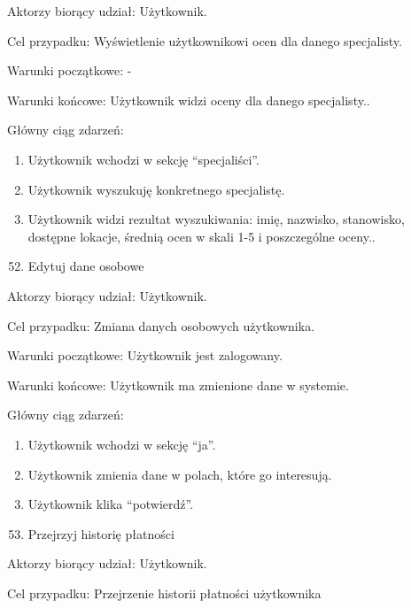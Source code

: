 \documentclass[
]{article}
\providecommand{\tightlist}{%
  \setlength{\itemsep}{0pt}\setlength{\parskip}{0pt}}
\begin{document}
{Aktorzy biorący udział: Użytkownik.}

{Cel przypadku: Wyświetlenie użytkownikowi ocen dla danego specjalisty.}

{Warunki początkowe: -}

{Warunki końcowe: Użytkownik widzi oceny dla danego specjalisty..}

{Główny ciąg zdarzeń:}

\begin{enumerate}
\tightlist
\item
  {Użytkownik wchodzi w sekcję ``specjaliści''.}
\item
  {Użytkownik wyszukuję konkretnego specjalistę.}
\item
  {Użytkownik widzi rezultat wyszukiwania: imię, nazwisko, stanowisko,
  dostępne lokacje, średnią ocen w skali 1-5 i poszczególne oceny..}
\end{enumerate}

{}

\begin{enumerate}
\setcounter{enumi}{51}
\tightlist
\item
  {Edytuj dane osobowe}
\end{enumerate}

{Aktorzy biorący udział: Użytkownik.}

{Cel przypadku: Zmiana danych osobowych użytkownika.}

{Warunki początkowe: Użytkownik jest zalogowany.}

{Warunki końcowe: Użytkownik ma zmienione dane w systemie.}

{Główny ciąg zdarzeń:}

\begin{enumerate}
\tightlist
\item
  {Użytkownik wchodzi w sekcję ``ja''.}
\item
  {Użytkownik zmienia dane w polach, które go interesują.}
\item
  {Użytkownik klika ``potwierdź''.}
\end{enumerate}

{}

\begin{enumerate}
\setcounter{enumi}{52}
\tightlist
\item
  {Przejrzyj historię płatności}
\end{enumerate}

{Aktorzy biorący udział: Użytkownik.}

{Cel przypadku: Przejrzenie historii płatności użytkownika}
\end{document}
